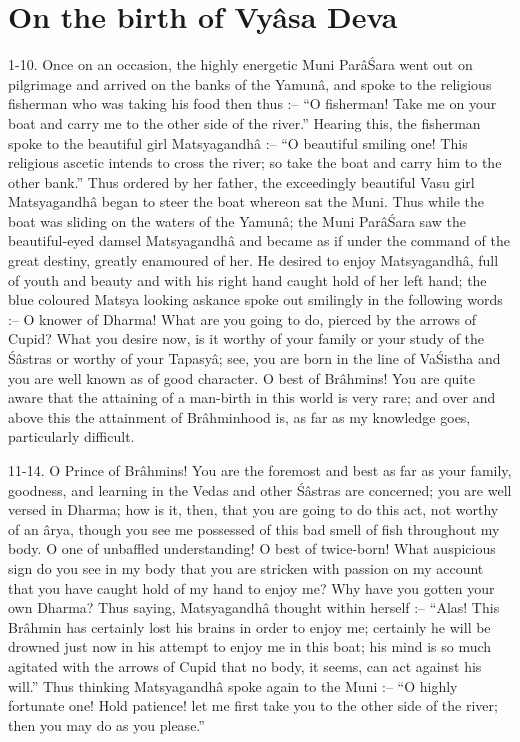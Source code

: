 ﻿\chapter{On the birth of Vy\^asa Deva}


1-10. Once on an occasion, the highly energetic Muni Par\^a\'Sara went out on pilgrimage and arrived on the banks of the Yamun\^a, and spoke to the religious fisherman who was taking his food then thus :-- ``O fisherman! Take me on your boat and carry me to the other side of the river.'' Hearing this, the fisherman spoke to the beautiful girl Matsyagandh\^a :-- ``O beautiful smiling one! This religious ascetic intends to cross the river; so take the boat and carry him to the other bank.'' Thus ordered by her father, the exceedingly beautiful Vasu girl Matsyagandh\^a began to steer the boat whereon sat the Muni. Thus while the boat was sliding on the waters of the Yamun\^a; the Muni Par\^a\'Sara saw the beautiful-eyed damsel Matsyagandh\^a and became as if under the command of the great destiny, greatly enamoured of her. He desired to enjoy Matsyagandh\^a, full of youth and beauty and with his right hand caught hold of her left hand; the blue coloured Matsya looking askance spoke out smilingly in the following words :-- O knower of Dharma! What are you going to do, pierced by the arrows of Cupid? What you desire now, is it worthy of your family or your study of the \'S\^astras or worthy of your Tapasy\^a; see, you are born in the line of Va\'Sistha and you are well known as of good character. O best of Br\^ahmins! You are quite aware that the attaining of a man-birth in this world is very rare; and over and above this the attainment of Br\^ahminhood is, as far as my knowledge goes, particularly difficult.

11-14. O Prince of Br\^ahmins! You are the foremost and best as far as your family, goodness, and learning in the Vedas and other \'S\^astras are concerned; you are well versed in Dharma; how is it, then, that you are going to do this act, not worthy of an \^arya, though you see me possessed of this bad smell of fish throughout my body. O one of unbaffled understanding! O best of twice-born! What auspicious sign do you see in my body that you are stricken with passion on my account that you have caught hold of my hand to enjoy me? Why have you gotten your own Dharma? Thus saying, Matsyagandh\^a thought within herself :-- ``Alas! This Br\^ahmin has certainly lost his brains in order to enjoy me; certainly he will be drowned just now in his attempt to enjoy me in this boat; his mind is so much agitated with the arrows of Cupid that no body, it seems, can act against his will.'' Thus thinking Matsyagandh\^a spoke again to the Muni :-- ``O highly fortunate one! Hold patience! let me first take you to the other side of the river; then you may do as you please.''

